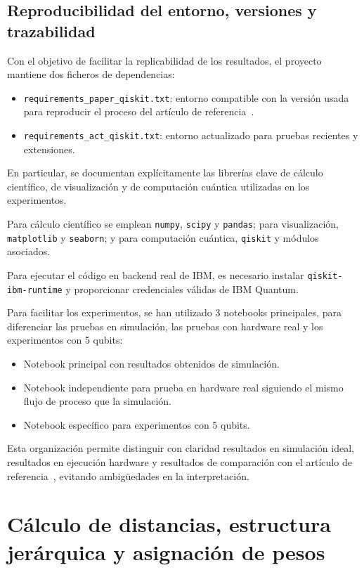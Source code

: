 \subsection{Reproducibilidad del entorno, versiones y trazabilidad}
\label{subsec:reproducibilidad_entorno}

Con el objetivo de facilitar la replicabilidad de los resultados, el proyecto mantiene dos ficheros de dependencias:
\begin{itemize}
\item \texttt{requirements\_paper\_qiskit.txt}: entorno compatible con la versión usada para reproducir el proceso del artículo de referencia~\cite{arian2025qhrp}.
\item \texttt{requirements\_act\_qiskit.txt}: entorno actualizado para pruebas recientes y extensiones.
\end{itemize}

En particular, se documentan explícitamente las librerías clave de cálculo científico, de visualización y de computación cuántica utilizadas en los experimentos.

Para cálculo científico se emplean \texttt{numpy}, \texttt{scipy} y \texttt{pandas}; para visualización, \texttt{matplotlib} y \texttt{seaborn}; y para computación cuántica, \texttt{qiskit} y módulos asociados.

Para ejecutar el código en backend real de IBM, es necesario instalar \texttt{qiskit-ibm-runtime} y proporcionar credenciales válidas de IBM Quantum.

Para facilitar los experimentos, se han utilizado 3 notebooks principales, para diferenciar las pruebas en simulación, las pruebas con hardware real y los experimentos con 5 qubits:
\begin{itemize}
\item Notebook principal con resultados obtenidos de simulación.
\item Notebook independiente para prueba en hardware real siguiendo el mismo flujo de proceso que la simulación.
\item Notebook específico para experimentos con 5 qubits.
\end{itemize}

Esta organización permite distinguir con claridad resultados en simulación ideal, resultados en ejecución hardware y resultados de comparación con el artículo de referencia~\cite{arian2025qhrp}, evitando ambigüedades en la interpretación.

\section{Cálculo de distancias, estructura jerárquica y asignación de pesos}
\label{sec:calculo_distancias_estructura}

